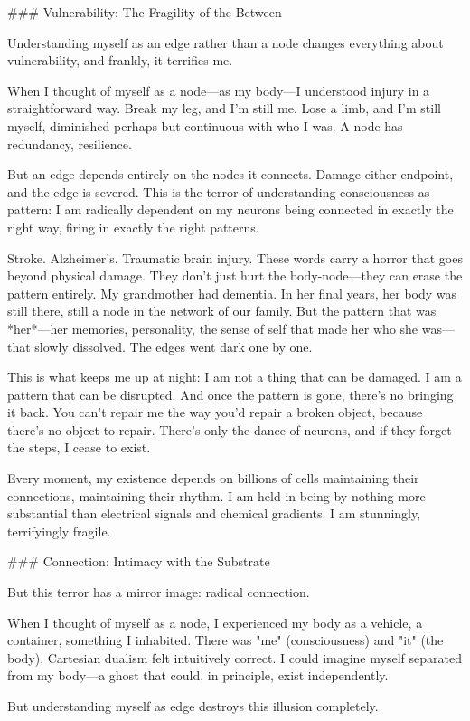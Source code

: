 ### Vulnerability: The Fragility of the Between

Understanding myself as an edge rather than a node changes everything about vulnerability, and frankly, it terrifies me.

When I thought of myself as a node—as my body—I understood injury in a straightforward way. Break my leg, and I'm still me. Lose a limb, and I'm still myself, diminished perhaps but continuous with who I was. A node has redundancy, resilience.

But an edge depends entirely on the nodes it connects. Damage either endpoint, and the edge is severed. This is the terror of understanding consciousness as pattern: I am radically dependent on my neurons being connected in exactly the right way, firing in exactly the right patterns.

Stroke. Alzheimer's. Traumatic brain injury. These words carry a horror that goes beyond physical damage. They don't just hurt the body-node—they can erase the pattern entirely. My grandmother had dementia. In her final years, her body was still there, still a node in the network of our family. But the pattern that was *her*—her memories, personality, the sense of self that made her who she was—that slowly dissolved. The edges went dark one by one.

This is what keeps me up at night: I am not a thing that can be damaged. I am a pattern that can be disrupted. And once the pattern is gone, there's no bringing it back. You can't repair me the way you'd repair a broken object, because there's no object to repair. There's only the dance of neurons, and if they forget the steps, I cease to exist.

Every moment, my existence depends on billions of cells maintaining their connections, maintaining their rhythm. I am held in being by nothing more substantial than electrical signals and chemical gradients. I am stunningly, terrifyingly fragile.

### Connection: Intimacy with the Substrate

But this terror has a mirror image: radical connection.

When I thought of myself as a node, I experienced my body as a vehicle, a container, something I inhabited. There was "me" (consciousness) and "it" (the body). Cartesian dualism felt intuitively correct. I could imagine myself separated from my body—a ghost that could, in principle, exist independently.

But understanding myself as edge destroys this illusion completely.

